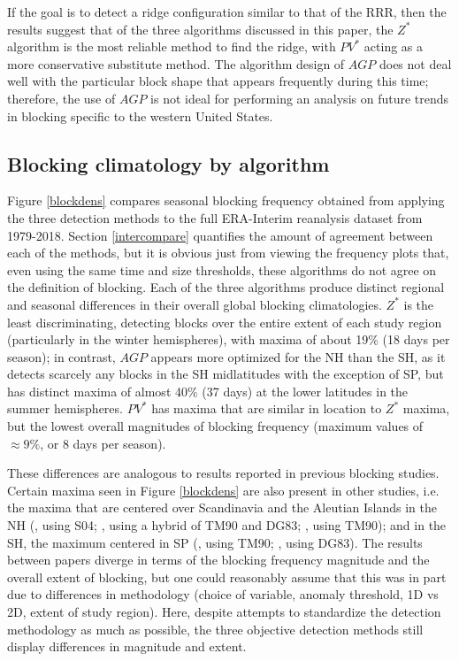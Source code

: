 \documentclass[smallextended]{svjour3}       %
\numberwithin{equation}{section}
\begin{document}
If the goal is to detect a ridge configuration similar to that of the RRR, then the results suggest that of the three algorithms discussed in this paper, the $Z^*$ algorithm is the most reliable method to find the ridge, with $PV^*$ acting as a more conservative substitute method. The algorithm design of $AGP$ does not deal well with the particular block shape that appears frequently during this time; therefore, the use of $AGP$ is not ideal for performing an analysis on future trends in blocking specific to the western United States. 


\subsection{Blocking climatology by algorithm}\label{blockingclim}

Figure \ref{blockdens} compares seasonal blocking frequency obtained from applying the three detection methods to the full ERA-Interim reanalysis dataset from 1979-2018. Section \ref{intercompare} quantifies the amount of agreement between each of the methods, but it is obvious just from viewing the frequency plots that, even using the same time and size thresholds, these algorithms do not agree on the definition of blocking. Each of the three algorithms produce distinct regional and seasonal differences in their overall global blocking climatologies. $Z^*$ is the least discriminating, detecting blocks over the entire extent of each study region (particularly in the winter hemispheres), with maxima of about 19\% (18 days per season); in contrast, $AGP$ appears more optimized for the NH than the SH, as it detects scarcely any blocks in the SH midlatitudes with the exception of SP, but has distinct maxima of almost 40\% (37 days) at the lower latitudes in the summer hemispheres.  $PV^*$ has maxima that are similar in location to $Z^*$ maxima, but the lowest overall magnitudes of blocking frequency (maximum values of $\approx 9\%$, or 8 days per season). 


These differences are analogous to results reported in previous blocking studies. Certain maxima seen in Figure \ref{blockdens} are also present in other studies, i.e. the maxima that are centered over Scandinavia and the Aleutian Islands in the NH (\citealt{croci-maspoli_multifaceted_2007}, using S04; \citealt{dunn-sigouin_evaluation_2012}, using a hybrid of TM90 and DG83; \citealt{cheung_revisiting_2013}, using TM90); and in the SH, the maximum centered in SP (\citealt{wiedenmann_climatology_2002}, using TM90; \citealt{parsons_assessment_2016}, using DG83). The results between papers diverge in terms of the blocking frequency magnitude and the overall extent of blocking, but one could reasonably assume that this was in part due to differences in methodology (choice of variable, anomaly threshold, 1D vs 2D, extent of study region). Here, despite attempts to standardize the detection methodology as much as possible, the three objective detection methods still display differences in magnitude and extent. 
\end{document}
